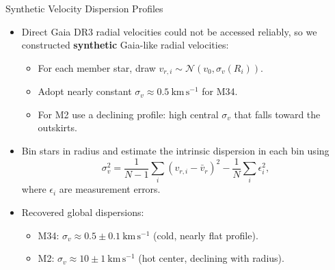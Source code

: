 \documentclass{beamer}
\begin{document}
\begin{frame}{Synthetic Velocity Dispersion Profiles}
    \begin{itemize}
        \item Direct Gaia DR3 radial velocities could not be accessed reliably, so we constructed \textbf{synthetic} Gaia-like radial velocities:
        \begin{itemize}
            \item For each member star, draw $v_{r,i} \sim \mathcal{N}(v_0, \sigma_v(R_i))$.
            \item Adopt nearly constant $\sigma_v \approx 0.5~\mathrm{km\,s^{-1}}$ for M34.
            \item For M2 use a declining profile: high central $\sigma_v$ that falls toward the outskirts.
        \end{itemize}
        \item Bin stars in radius and estimate the intrinsic dispersion in each bin using
        \[
            \sigma_v^2 = \frac{1}{N-1}\sum_i (v_{r,i}-\bar{v}_r)^2 - \frac{1}{N}\sum_i \epsilon_i^2,
        \]
        where $\epsilon_i$ are measurement errors.
        \item Recovered global dispersions:
        \begin{itemize}
            \item M34: $\sigma_v \approx 0.5 \pm 0.1~\mathrm{km\,s^{-1}}$ (cold, nearly flat profile).
            \item M2: $\sigma_v \approx 10 \pm 1~\mathrm{km\,s^{-1}}$ (hot center, declining with radius).
        \end{itemize}
    \end{itemize}
\end{frame}
\end{document}
